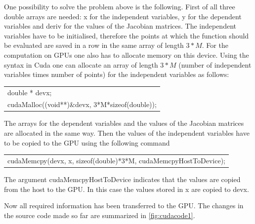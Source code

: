 \documentclass[11pt,twoside]{article}
\begin{document}
One possibility to solve the problem above is the following. First of all
three {\sf double} arrays are needed: {\sf x} for the independent variables, 
{\sf y} for the dependent variables and {\sf deriv} for the values of the 
Jacobian matrices. The independent variables have to be initialised, therefore 
the points at which the function should be evaluated are saved in a row in the 
same array of length $3*M$. For the computation on GPUs one also has to allocate memory
on this device. Using the syntax in Cuda one can allocate an array of 
length $3*M$ (number of independent variables times number of points) for 
the independent variables as follows:
\begin{center}
  \begin{tabular}{l}
    {\sf double * devx;}\\
    {\sf cudaMalloc((void**)\&devx, 3*M*sizeof(double));}\\
  \end{tabular}
\end{center}
The arrays for the dependent variables and the values of the Jacobian matrices
are allocated in the same way. Then the values of the independent variables 
have to be copied to the GPU using the following command
\begin{center}
  \begin{tabular}{l}
    {\sf cudaMemcpy(devx, x, sizeof(double)*3*M, cudaMemcpyHostToDevice);}\\
  \end{tabular}
\end{center}   
The argument {\sf cudaMemcpyHostToDevice} indicates that the values are copied from 
the host to the GPU. In this case the values stored in {\sf x} are copied to {\sf devx}. 

Now all required information has been transferred to the GPU. The changes 
in the source code made so far are summarized in \autoref{fig:cudacode1}.
 
\end{document}
